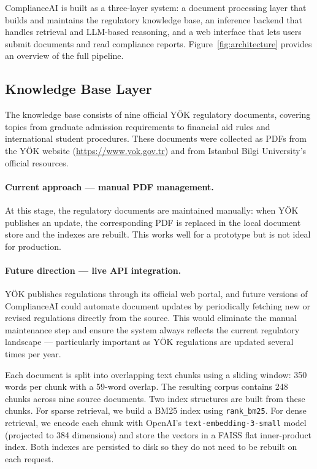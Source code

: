 ComplianceAI is built as a three-layer system: a document processing layer
that builds and maintains the regulatory knowledge base, an inference backend
that handles retrieval and LLM-based reasoning, and a web interface that lets
users submit documents and read compliance reports.
Figure~\ref{fig:architecture} provides an overview of the full pipeline.

\subsection{Knowledge Base Layer}

The knowledge base consists of nine official YÖK regulatory documents,
covering topics from graduate admission requirements to financial aid rules
and international student procedures.
These documents were collected as PDFs from the YÖK website
(\url{https://www.yok.gov.tr}) and from Istanbul Bilgi University's
official resources.

\paragraph{Current approach --- manual PDF management.}
At this stage, the regulatory documents are maintained manually: when YÖK
publishes an update, the corresponding PDF is replaced in the local
document store and the indexes are rebuilt.
This works well for a prototype but is not ideal for production.

\paragraph{Future direction --- live API integration.}
YÖK publishes regulations through its official web portal, and future
versions of ComplianceAI could automate document updates by periodically
fetching new or revised regulations directly from the source.
This would eliminate the manual maintenance step and ensure the system
always reflects the current regulatory landscape --- particularly important
as YÖK regulations are updated several times per year.

Each document is split into overlapping text chunks using a sliding window:
350 words per chunk with a 59-word overlap.
The resulting corpus contains 248 chunks across nine source documents.
Two index structures are built from these chunks.
For sparse retrieval, we build a BM25 index using \texttt{rank\_bm25}.
For dense retrieval, we encode each chunk with OpenAI's
\texttt{text-embedding-3-small} model (projected to 384 dimensions)
and store the vectors in a FAISS flat inner-product index.
Both indexes are persisted to disk so they do not need to be rebuilt
on each request.

